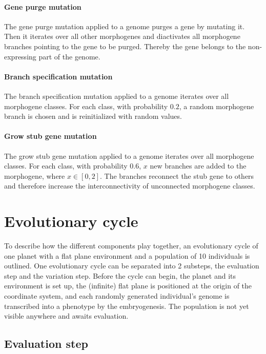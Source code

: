 \documentclass[main]{subfiles}
\begin{document}
\paragraph{Gene purge mutation}

The gene purge mutation applied to a genome purges a gene by mutating it. Then it iterates over all other morphogenes and diactivates all morphogene branches pointing to the gene to be purged. Thereby the gene belongs to the non-expressing part of the genome.

\paragraph{Branch specification mutation}

The branch specification mutation applied to a genome iterates over all morphogene classes. For each class, with probability $0.2$, a random morphogene branch is chosen and is reinitialized with random values. 

\paragraph{Grow stub gene mutation}

The grow stub gene mutation applied to a genome iterates over all morphogene classes. For each class, with probability $0.6$, $x$ new branches are added to the morphogene, where $x \in [0,2]$. The branches reconnect the stub gene to others and therefore increase the interconnectivity of unconnected morphogene classes.

\section{Evolutionary cycle}

To describe how the different components play together, an evolutionary cycle of one planet with a flat plane environment and a population of 10 individuals is outlined. One evolutionary cycle can be separated into 2 substeps, the evaluation step and the variation step. Before the cycle can begin, the planet and its environment is set up, the (infinite) flat plane is positioned at the origin of the coordinate system, and each randomly generated individual's genome is transcribed into a phenotype by the embryogenesis. The population is not yet visible anywhere and awaits evaluation.

\subsection{Evaluation step}
\end{document}
